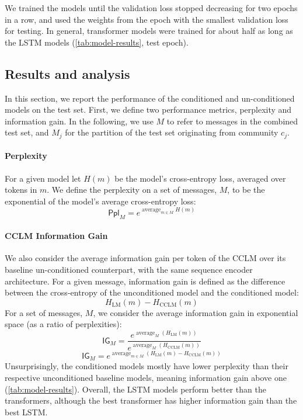 \documentclass[11pt]{article}
\newcommand\Ppl{\mathsf{Ppl}}
\newcommand\IG{\mathsf{IG}}
\DeclareMathOperator*{\avg}{average}
\begin{document}
We trained the models until the validation loss stopped decreasing for
two epochs in a row, and used the weights from the epoch with the
smallest validation loss for testing.  In general, transformer models
were trained for about half as long as the LSTM models (\cref{tab:model-results}, 
test epoch).

\subsection{Results and analysis}

In this section, we report the performance of the conditioned and un-conditioned
models on the test set.
First, we define two performance metrics, perplexity and information gain.
In the following, we use $M$ to refer to messages in the
combined test set, and $M_j$ for the partition of the test set originating from 
community $c_j$.

\paragraph{Perplexity}

For a given model let $H(m)$ be the model's cross-entropy loss,
averaged over tokens in $m$.
We define the perplexity on a set of messages, $M$,
to be the exponential of the model's average cross-entropy loss:
\[\Ppl_M = e^{\avg_{m\in M} H(m)}\]

\paragraph{CCLM Information Gain}

We also consider the average information gain per token of the CCLM over its baseline
un-conditioned counterpart, with the same sequence encoder architecture.
For a given message, information gain is defined as the difference
between the cross-entropy of the unconditioned model and the conditioned model:
\[H_{\mathrm{LM}}(m) - H_{\mathrm{CCLM}}(m)\]
For a set of messages, $M$, we consider the average information gain
in exponential space (as a ratio of perplexities):
\[\IG_M = \frac{e^{\avg_M(H_{\mathrm{LM}}(m))}}{e^{\avg_M(H_{\mathrm{CCLM}}(m))}}\]
\[\IG_M = {e^{\avg_{m∈M}(H_{\mathrm{LM}}(m) - H_{\mathrm{CCLM}}(m))}}\]
%
Unsurprisingly, the conditioned models mostly have lower perplexity 
than their respective unconditioned baseline models, 
meaning information gain above one (\cref{tab:model-results}).
Overall, the LSTM models perform better than the transformers, 
although the best transformer has higher information gain than the best LSTM.
\end{document}
